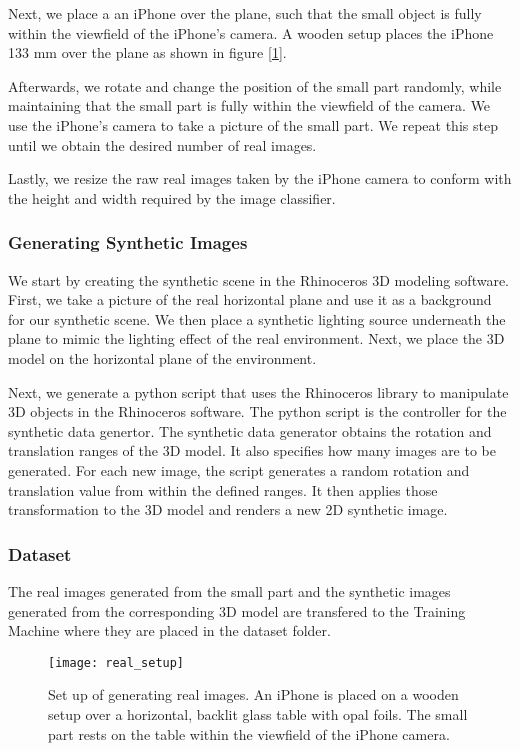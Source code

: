 Next, we place a an iPhone over the plane, such that the small object is fully within the viewfield of the iPhone's camera. A wooden setup places the iPhone 133 mm over the plane as shown in figure [\ref{fig:RealSetup}].

Afterwards, we rotate and change the position of the small part randomly, while maintaining that the small part is fully within the viewfield of the camera. We use the iPhone's camera to take a picture of the small part. We repeat this step until we obtain the desired number of real images.

Lastly, we resize the raw real images taken by the iPhone camera to conform with the height and width required by the image classifier.

\subsubsection{Generating Synthetic Images}
We start by creating the synthetic scene in the Rhinoceros 3D modeling software. First, we take a picture of the real horizontal plane and use it as a background for our synthetic scene. We then place a synthetic lighting source underneath the plane to mimic the lighting effect of the real environment. Next, we place the 3D model on the horizontal plane of the environment.

Next, we generate a python script that uses the Rhinoceros library to manipulate 3D objects in the Rhinoceros software. The python script is the controller for the synthetic data genertor. The synthetic data generator obtains the rotation and translation ranges of the 3D model. It also specifies how many images are to be generated. For each new image, the script generates a random rotation and translation value from within the defined ranges. It then applies those transformation to the 3D model and renders a new 2D synthetic image.

\subsubsection{Dataset}
The real images generated from the small part and the synthetic images generated from the corresponding 3D model are transfered to the Training Machine where they are placed in the dataset folder.

\begin{figure}[H]
\centering
  \texttt{[image: real\_setup]}
\caption{Set up of generating real images. An iPhone is placed on a wooden setup over a horizontal, backlit glass table with opal foils. The small part rests on the table within the viewfield of the iPhone camera.}
\label{fig:RealSetup}
\end{figure}

